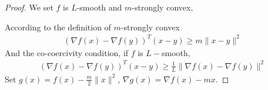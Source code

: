 \documentclass[11pt,a4paper]{article}
\begin{document}
\begin{proof}
We set $f$ is $L$-smooth and $m$-strongly convex,

According to the definition of $m$-strongly convex
\begin{equation}
    \begin{aligned}
        (\nabla f(x)-\nabla f(y))^T(x-y)\geq m \|x-y\|^2
    \end{aligned}
    \nonumber
\end{equation}
And the co-coercivity condition, if $f$ is $L-$smooth,
\begin{equation}
    \begin{aligned}
        (\nabla f(x)-\nabla f(y))^T(x-y)\geq \frac{1}{L}\|\nabla f(x)-\nabla f(y)\|^2
    \end{aligned}
    \nonumber
\end{equation}
Set $g(x)=f(x)-\frac{m}{2}\|x\|^2$, $\nabla g(x)=\nabla f(x)-mx$.


\end{proof}
\end{document}
